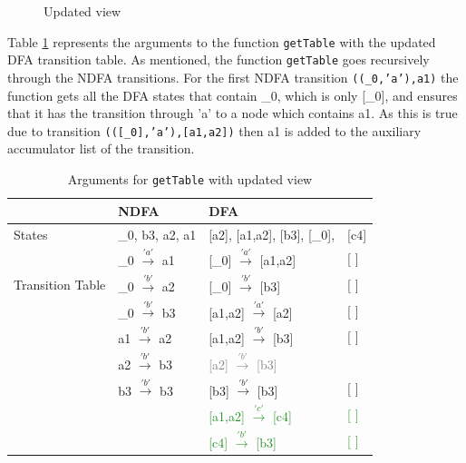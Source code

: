 \begin{figure}
    \centering
    \caption{Updated view}
    \label{fig:updatedfa}
\end{figure}

Table \ref{getTable} represents the arguments to the function \texttt{getTable} with the updated DFA transition table.
As mentioned, the function \texttt{getTable} goes recursively through the NDFA transitions. For the first NDFA transition \texttt{((\_0,'a'),a1)} the function gets all the DFA states that contain \_0, which is only [\_0], and ensures that it has the transition through 'a' to a node which contains a1. As this is true due to transition \texttt{(([\_0],'a'),[a1,a2])} then a1 is added to the auxiliary accumulator list of the transition.

\begin{table}[H]
  \begin{center}
    \begin{tabular}{ | p{3cm} |p{4cm}||p{3cm} p{1cm} |  }
    \hline
         & NDFA & DFA & \\ [1ex]
        \hline
        States & \_0, b3, a2, a1 & [a2], [a1,a2], [b3], [\_0], & [c4] \\ [0.7ex]
        \hline
        \multirow{3}{5em}{Transition Table} & \_0 $\xrightarrow{'a'}$ a1 & [\_0] $\xrightarrow{'a'}$ [a1,a2] & [ ]\\
        & \_0 $\xrightarrow{'b'}$ a2 & [\_0]    $\xrightarrow{'b'}$ [b3] & [ ]\\
        & \_0 $\xrightarrow{'b'}$ b3 & [a1,a2]  $\xrightarrow{'a'}$ [a2] & [ ]\\
        & a1  $\xrightarrow{'b'}$ a2 & [a1,a2]  $\xrightarrow{'b'}$ [b3] & [ ]\\
        & a2  $\xrightarrow{'b'}$ b3 & \textcolor{gray}{[a2]     $\xrightarrow{'b'}$ [b3]} &  \\
        & b3  $\xrightarrow{'b'}$ b3 & [b3]     $\xrightarrow{'b'}$ [b3] & [ ]\\
        &  & \textcolor{ForestGreen}{[a1,a2]  $\xrightarrow{'c'}$ [c4]} & \textcolor{ForestGreen}{[ ]}\\
        &  & \textcolor{ForestGreen}{[c4]  $\xrightarrow{'b'}$ [b3]} & \textcolor{ForestGreen}{[ ]}\\
        \hline
        \end{tabular}
  \end{center}
  \caption{Arguments for \texttt{getTable} with updated view}
  \label{getTable}
\end{table}

